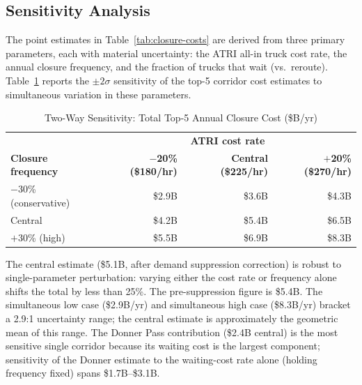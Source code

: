 \subsection{Sensitivity Analysis}
\label{sec:sensitivity}

The point estimates in Table~\ref{tab:closure-costs} are derived from three primary
parameters, each with material uncertainty: the ATRI all-in truck cost rate, the annual
closure frequency, and the fraction of trucks that wait (vs.\ reroute). Table~\ref{tab:sensitivity}
reports the $\pm 2\sigma$ sensitivity of the top-5 corridor cost estimates to simultaneous
variation in these parameters.

\begin{table}[h!]
\centering
\caption{Two-Way Sensitivity: Total Top-5 Annual Closure Cost (\$B/yr)}
\label{tab:sensitivity}
\begin{tabular}{lrrr}
\toprule
& \multicolumn{3}{c}{\textbf{ATRI cost rate}} \\
\textbf{Closure frequency} & \textbf{$-$20\% (\$180/hr)} & \textbf{Central (\$225/hr)} & \textbf{$+$20\% (\$270/hr)} \\
\midrule
$-$30\% (conservative) & \$2.9B & \$3.6B & \$4.3B \\
Central                 & \$4.2B & \$5.4B & \$6.5B \\
$+$30\% (high)         & \$5.5B & \$6.9B & \$8.3B \\
\bottomrule
\end{tabular}
\end{table}

The central estimate (\$5.1B, after demand suppression correction) is robust to single-parameter perturbation: varying
either the cost rate or frequency alone shifts the total by less than 25\%. The pre-suppression figure is \$5.4B. The
simultaneous low case (\$2.9B/yr) and simultaneous high case (\$8.3B/yr) bracket
a 2.9:1 uncertainty range; the central estimate is approximately the geometric
mean of this range. The Donner Pass contribution (\$2.4B central) is the most
sensitive single corridor because its waiting cost is the largest component;
sensitivity of the Donner estimate to the waiting-cost rate alone (holding
frequency fixed) spans \$1.7B--\$3.1B.
